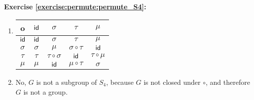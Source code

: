 \noindent\textbf{Exercise \ref{exercise:permute:permute_S4}:}
\begin{enumerate}[{a.}]
\item
\begin{tabular}{c| c c c c}
		o & $\sf{id}$ & $\sigma$ & $\tau$ & $\mu$\\
		\hline
		$\sf{id}$ & $\sf{id}$ & $\sigma$ & $\tau$ & $\mu$\\
		$\sigma$ & $\sigma$ & $\mu$ & $\sigma\circ\tau$ & $\sf{id}$\\
		$\tau$ & $\tau$ & $\tau\circ\sigma$ & $\sf{id}$ & $\tau\circ\mu$\\
		$\mu$ & $\mu$ & $\sf{id}$ & $\mu\circ\tau$ & $\sigma$\\
	\end{tabular}
	
\item
No, $G$ is not a subgroup of $S_4$, because $G$ is not closed under $\circ$, and therefore $G$ is not a group.
\end{enumerate}

